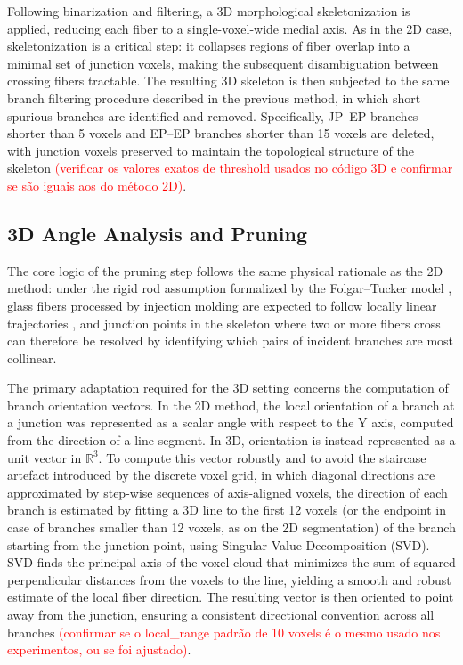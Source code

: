 Following binarization and filtering, a 3D morphological skeletonization is applied, reducing each fiber to a single-voxel-wide medial axis. As in the 2D case, skeletonization is a critical step: it collapses regions of fiber overlap into a minimal set of junction voxels, making the subsequent disambiguation between crossing fibers tractable. The resulting 3D skeleton is then subjected to the same branch filtering procedure described in the previous method, in which short spurious branches are identified and removed. Specifically, JP--EP branches shorter than 5 voxels and EP--EP branches shorter than 15 voxels are deleted, with junction voxels preserved to maintain the topological structure of the skeleton \textcolor{red}{(verificar os valores exatos de threshold usados no código 3D e confirmar se são iguais aos do método 2D)}.

\subsection{3D Angle Analysis and Pruning}

The core logic of the pruning step follows the same physical rationale as the 2D method: under the rigid rod assumption formalized by the Folgar--Tucker model \cite{folgar1984}, glass fibers processed by injection molding are expected to follow locally linear trajectories \cite{aguiar-base}, and junction points in the skeleton where two or more fibers cross can therefore be resolved by identifying which pairs of incident branches are most collinear.

The primary adaptation required for the 3D setting concerns the computation of branch orientation vectors. In the 2D method, the local orientation of a branch at a junction was represented as a scalar angle with respect to the Y axis, computed from the direction of a line segment. In 3D, orientation is instead represented as a unit vector in $\mathbb{R}^3$. To compute this vector robustly and to avoid the staircase artefact introduced by the discrete voxel grid, in which diagonal directions are approximated by step-wise sequences of axis-aligned voxels, the direction of each branch is estimated by fitting a 3D line to the first  12 voxels (or the endpoint in case of branches smaller than 12 voxels, as on the 2D segmentation) of the branch starting from the junction point, using Singular Value Decomposition (SVD). SVD finds the principal axis of the voxel cloud that minimizes the sum of squared perpendicular distances from the voxels to the line, yielding a smooth and robust estimate of the local fiber direction. The resulting vector is then oriented to point away from the junction, ensuring a consistent directional convention across all branches \textcolor{red}{(confirmar se o local\_range padrão de 10 voxels é o mesmo usado nos experimentos, ou se foi ajustado)}.

